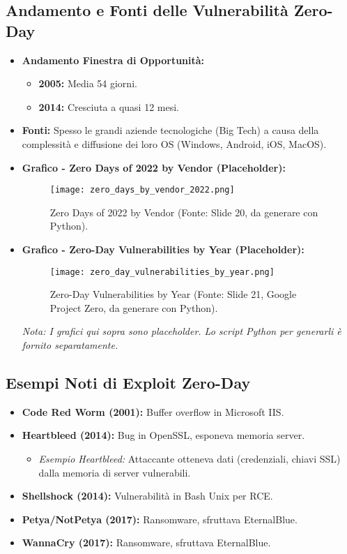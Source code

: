 \documentclass{article}
\begin{document}
\subsection{Andamento e Fonti delle Vulnerabilità Zero-Day}
\begin{itemize}
    \item \textbf{Andamento Finestra di Opportunità:}
    \begin{itemize}
        \item \textbf{2005:} Media 54 giorni.
        \item \textbf{2014:} Cresciuta a quasi 12 mesi.
    \end{itemize}
    \item \textbf{Fonti:} Spesso le grandi aziende tecnologiche (Big Tech) a causa della complessità e diffusione dei loro OS (Windows, Android, iOS, MacOS).
    \item \textbf{Grafico - Zero Days of 2022 by Vendor (Placeholder):}
    \begin{figure}[H]
        \centering
        \texttt{[image: zero\_days\_by\_vendor\_2022.png]}
        \caption{Zero Days of 2022 by Vendor (Fonte: Slide 20, da generare con Python).}
        \label{fig:zero_days_vendor}
    \end{figure}
    \item \textbf{Grafico - Zero-Day Vulnerabilities by Year (Placeholder):}
    \begin{figure}[H]
        \centering
        \texttt{[image: zero\_day\_vulnerabilities\_by\_year.png]}
        \caption{Zero-Day Vulnerabilities by Year (Fonte: Slide 21, Google Project Zero, da generare con Python).}
        \label{fig:zero_days_year}
    \end{figure}
    \textit{Nota: I grafici qui sopra sono placeholder. Lo script Python per generarli è fornito separatamente.}
\end{itemize}

\subsection{Esempi Noti di Exploit Zero-Day}
\begin{itemize}
    \item \textbf{Code Red Worm (2001):} Buffer overflow in Microsoft IIS.
    \item \textbf{Heartbleed (2014):} Bug in OpenSSL, esponeva memoria server.
        \begin{itemize}
            \item \textit{Esempio Heartbleed:} Attaccante otteneva dati (credenziali, chiavi SSL) dalla memoria di server vulnerabili.
        \end{itemize}
    \item \textbf{Shellshock (2014):} Vulnerabilità in Bash Unix per RCE.
    \item \textbf{Petya/NotPetya (2017):} Ransomware, sfruttava EternalBlue.
    \item \textbf{WannaCry (2017):} Ransomware, sfruttava EternalBlue.
\end{itemize}
\end{document}
